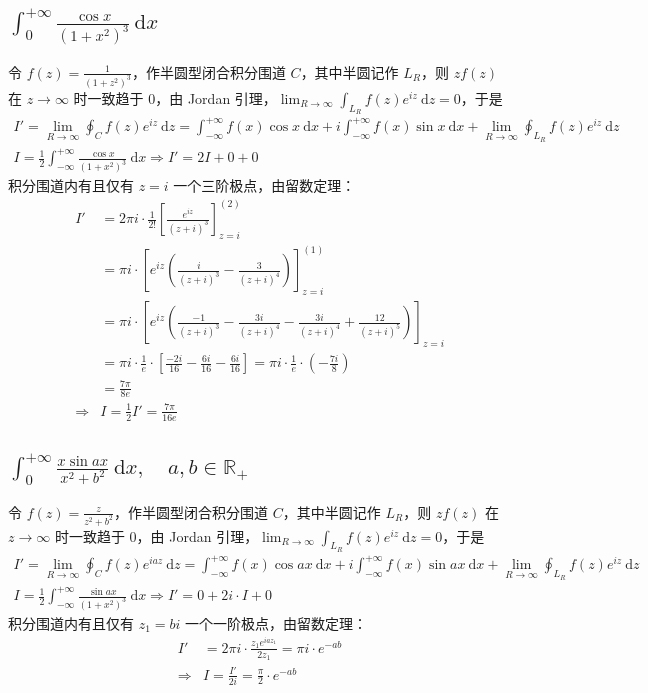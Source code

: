 \documentclass[UTF8]{report}
\def\R{\mathbb{R}}
\theoremstyle{MyLineTheoremStyle} %
\theoremstyle{MyBlockTheoremStyle} %
\theoremstyle{MySubsubsectionStyle} %
\begin{document}
\subsection{$\displaystyle \int_{0}^{+\infty}  \frac{\cos x}{\left(1 + x^2\right)^3}  \ \mathrm{d}x$}
令 $f(z) = \frac{1}{\left(1 + z^2\right)^3}$，作半圆型闭合积分围道 $C$，其中半圆记作 $L_R$，则 $zf(z)$ 在 $z \to \infty$ 时一致趋于 0，由 Jordan 引理，$\lim_{R \to \infty}\int_{L_R} f(z)e^{iz} \ \mathrm{d}z = 0$，于是
\begin{gather}
I' = \lim_{R \to \infty}\oint_{C} f(z)e^{iz} \ \mathrm{d}z = \int_{-\infty}^{+\infty}f(x)\cos x \ \mathrm{d}x + i \int_{-\infty}^{+\infty}f(x)\sin x \ \mathrm{d}x +  \lim_{R \to \infty}\oint_{L_R} f(z)e^{iz} \ \mathrm{d}z \\ 
I = \frac{1}{2}\int_{-\infty}^{+\infty}  \frac{\cos x}{\left(1 + x^2\right)^3}  \ \mathrm{d}x \Longrightarrow I' = 2I + 0 + 0 
\end{gather}
积分围道内有且仅有 $z = i$ 一个三阶极点，由留数定理：
\begin{align}
I' &= 2\pi i \cdot \frac{1}{2!} \left[ \frac{e^{iz}}{(z + i)^3} \right]^{(2)}_{z = i} \\
&= \pi i \cdot \left[ e^{iz} \left( \frac{i}{(z + i)^3} - \frac{3}{(z + i)^4}\right) \right]^{(1)}_{z = i} \\
&= \pi i \cdot \left[ e^{iz} \left( \frac{-1}{(z + i)^3} - \frac{3i}{(z + i)^4} - \frac{3i}{(z + i)^4} + \frac{12}{(z + i)^5}\right) \right]_{z = i} \\
&= \pi i \cdot \frac{1}{e} \cdot \left[ \frac{-2i}{16} - \frac{6i}{16} - \frac{6i}{16} \right] = \pi i \cdot \frac{1}{e}\cdot \left(- \frac{7i}{8}\right) \\ 
& = \frac{7\pi}{8e} \\
\Longrightarrow 
&\boxed{
I = \frac{1}{2}I' = \frac{7\pi}{16e}
}
\end{align}

\subsection{$\displaystyle \int_{0}^{+\infty} \frac{x\sin ax}{x^2 + b^2} \ \mathrm{d}x,\quad a, b \in \R_+ $}
令 $f(z) = \frac{z}{z^2 + b^2}$，作半圆型闭合积分围道 $C$，其中半圆记作 $L_R$，则 $zf(z)$ 在 $z \to \infty$ 时一致趋于 0，由 Jordan 引理，$\lim_{R \to \infty}\int_{L_R} f(z)e^{iz} \ \mathrm{d}z = 0$，于是
\begin{gather}
I' = \lim_{R \to \infty}\oint_{C} f(z)e^{iaz} \ \mathrm{d}z = \int_{-\infty}^{+\infty}f(x)\cos ax \ \mathrm{d}x + i \int_{-\infty}^{+\infty}f(x)\sin ax \ \mathrm{d}x +  \lim_{R \to \infty}\oint_{L_R} f(z)e^{iz} \ \mathrm{d}z \\
I = \frac{1}{2}\int_{-\infty}^{+\infty}  \frac{\sin ax}{\left(1 + x^2\right)^3}  \ \mathrm{d}x \Longrightarrow I' = 0 + 2i\cdot I + 0 
\end{gather}
积分围道内有且仅有 $z_1 = bi$ 一个一阶极点，由留数定理：
\begin{align}
I' 
&= 2\pi i \cdot \frac{z_1e^{iaz_1}}{2z_1} = \pi i \cdot e^{-ab} \\
\Longrightarrow & 
\boxed{
    I = \frac{I'}{2i} = \frac{\pi}{2} \cdot e^{-ab}
}
\end{align}
\end{document}
